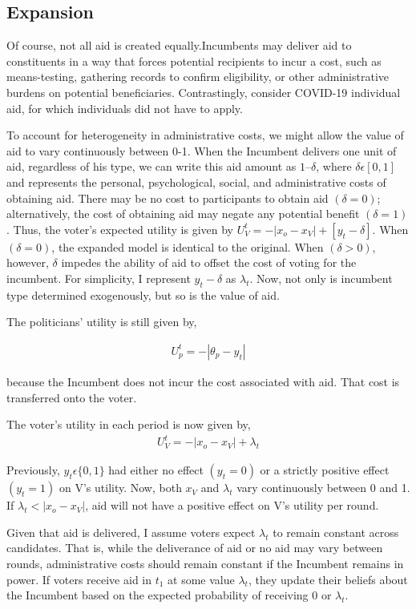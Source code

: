 \documentclass[12pt]{paper}
\begin{document}
\subsection{Expansion}
Of course, not all aid is created equally.Incumbents may deliver aid to constituents in a way that forces potential recipients to incur a cost, such as means-testing, gathering records to confirm eligibility, or other administrative burdens on potential beneficiaries. Contrastingly, consider COVID-19 individual aid, for which individuals did not have to apply.

To account for heterogeneity in administrative costs, we might allow the value of aid to vary continuously between 0-1. When the Incumbent delivers one unit of aid, regardless of his type, we can write this aid amount as $1 – \delta$, where $\delta \epsilon [0,1]$ and represents the personal, psychological, social, and administrative costs of obtaining aid. There may be no cost to participants to obtain aid $(\delta = 0)$; alternatively, the cost of obtaining aid may negate any potential benefit $(\delta = 1)$. Thus, the voter’s expected utility is given by $U_{V}^t = -|x_o - x_V| + [y_t - \delta]$. When $(\delta = 0)$, the expanded model is identical to the original. When $(\delta > 0)$, however, $\delta$ impedes the ability of aid to offset the cost of voting for the incumbent. For simplicity, I represent $y_t - \delta$ as  $\lambda_t$. Now, not only is incumbent type determined exogenously, but so is the value of aid.


The politicians’ utility is still given by,

\begin{gather}
U_{p}^t = -|\theta_p - y_t|
\end{gather}

because the Incumbent does not incur the cost associated with aid. That cost is transferred onto the voter.

The voter’s utility in each period is now given by, 
\begin{gather}
U_{V}^t = -|x_o - x_V| + \lambda_t
\end{gather}

Previously, $y_t \epsilon \{0,1\}$ had either no effect $(y_t = 0)$ or a strictly positive effect $(y_t = 1)$ on V's utility. Now, both $x_V$ and $\lambda_t$ vary continuously between 0 and 1. If $\lambda_t < |x_o - x_V|$, aid will not have a positive effect on V’s utility per round. 

Given that aid is delivered, I assume voters expect $\lambda_t$ to remain constant across candidates. That is, while the deliverance of aid or no aid may vary between rounds, administrative costs should remain constant if the Incumbent remains in power. If voters receive aid in $t_1$ at some value $\lambda_t$, they update their beliefs about the Incumbent based on the expected probability of receiving 0 or $\lambda_t$.
\end{document}
